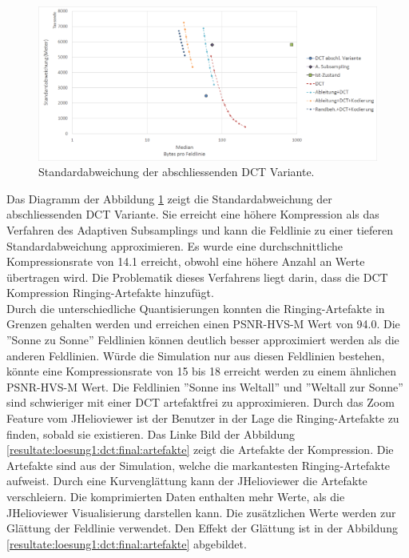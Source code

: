 \begin{figure}[!htbp]
	\center	\includegraphics[width=1\textwidth,keepaspectratio]{./pictures/resultate/loesung1/loesung1-12/resultate.png}
	\caption{Standardabweichung der abschliessenden DCT Variante.}	\label{resultate:loesung1:dct:abschliessend:standardabweichung}
\end{figure} 
Das Diagramm der Abbildung \ref{resultate:loesung1:dct:abschliessend:standardabweichung} zeigt die Standardabweichung der abschliessenden DCT Variante. Sie erreicht eine höhere Kompression als das Verfahren des Adaptiven Subsamplings und kann die Feldlinie zu einer tieferen Standardabweichung approximieren. Es wurde eine durchschnittliche Kompressionsrate von 14.1 erreicht, obwohl eine höhere Anzahl an Werte übertragen wird. Die Problematik dieses Verfahrens liegt darin, dass die DCT Kompression Ringing-Artefakte hinzufügt.\\
Durch die unterschiedliche Quantisierungen konnten die Ringing-Artefakte in Grenzen gehalten werden und erreichen einen PSNR-HVS-M  Wert von 94.0. Die ''Sonne zu Sonne'' Feldlinien können deutlich besser approximiert werden als die anderen Feldlinien. Würde die Simulation nur aus diesen Feldlinien bestehen, könnte eine Kompressionsrate von 15 bis 18 erreicht werden zu einem ähnlichen PSNR-HVS-M Wert. Die Feldlinien ''Sonne ins Weltall'' und ''Weltall zur Sonne'' sind schwieriger mit einer DCT artefaktfrei zu approximieren.  Durch das Zoom Feature vom JHelioviewer ist der Benutzer in der Lage die Ringing-Artefakte zu finden, sobald sie existieren. Das Linke Bild der Abbildung \ref{resultate:loesung1:dct:final:artefakte} zeigt die Artefakte der Kompression. Die Artefakte sind aus der Simulation, welche die markantesten Ringing-Artefakte aufweist. Durch eine Kurvenglättung kann der JHelioviewer die Artefakte verschleiern. Die komprimierten Daten enthalten mehr Werte, als die JHelioviewer Visualisierung darstellen kann. Die zusätzlichen Werte werden zur Glättung der Feldlinie verwendet. Den Effekt der Glättung ist in der Abbildung \ref{resultate:loesung1:dct:final:artefakte} abgebildet.

